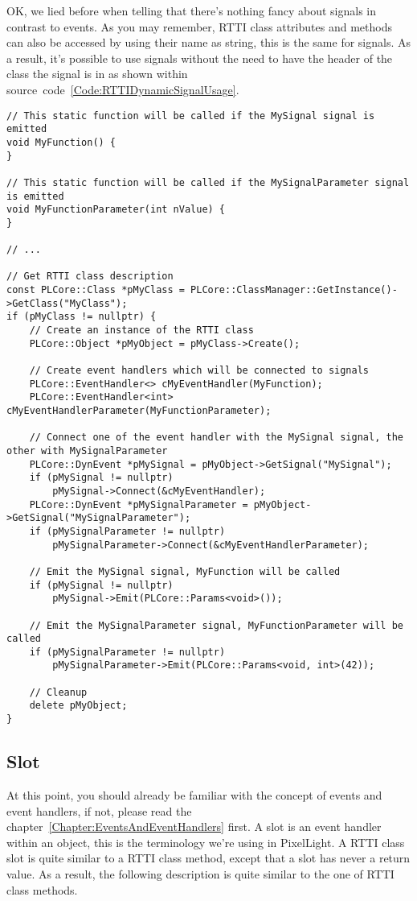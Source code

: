 OK, we lied before when telling that there's nothing fancy about signals in contrast to events. As you may remember, RTTI class attributes and methods can also be accessed by using their name as string, this is the same for signals. As a result, it's possible to use signals without the need to have the header of the class the signal is in as shown within source~code~\ref{Code:RTTIDynamicSignalUsage}.
\begin{lstlisting}[label=Code:RTTIDynamicSignalUsage,caption={Using signals of a RTTI class dynamically}]
// This static function will be called if the MySignal signal is emitted
void MyFunction() {
}

// This static function will be called if the MySignalParameter signal is emitted
void MyFunctionParameter(int nValue) {
}

// ...

// Get RTTI class description
const PLCore::Class *pMyClass = PLCore::ClassManager::GetInstance()->GetClass("MyClass");
if (pMyClass != nullptr) {
	// Create an instance of the RTTI class
	PLCore::Object *pMyObject = pMyClass->Create();

	// Create event handlers which will be connected to signals
	PLCore::EventHandler<> cMyEventHandler(MyFunction);
	PLCore::EventHandler<int> cMyEventHandlerParameter(MyFunctionParameter);

	// Connect one of the event handler with the MySignal signal, the other with MySignalParameter
	PLCore::DynEvent *pMySignal = pMyObject->GetSignal("MySignal");
	if (pMySignal != nullptr)
		pMySignal->Connect(&cMyEventHandler);
	PLCore::DynEvent *pMySignalParameter = pMyObject->GetSignal("MySignalParameter");
	if (pMySignalParameter != nullptr)
		pMySignalParameter->Connect(&cMyEventHandlerParameter);

	// Emit the MySignal signal, MyFunction will be called
	if (pMySignal != nullptr)
		pMySignal->Emit(PLCore::Params<void>());

	// Emit the MySignalParameter signal, MyFunctionParameter will be called
	if (pMySignalParameter != nullptr)
		pMySignalParameter->Emit(PLCore::Params<void, int>(42));

	// Cleanup
	delete pMyObject;
}
\end{lstlisting}



\subsection{Slot}
At this point, you should already be familiar with the concept of events and event handlers, if not, please read the chapter~\ref{Chapter:EventsAndEventHandlers} first. A slot is an event handler within an object, this is the terminology we're using in PixelLight. A RTTI class slot is quite similar to a RTTI class method, except that a slot has never a return value. As a result, the following description is quite similar to the one of RTTI class methods.

